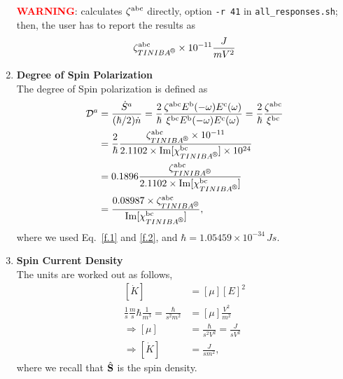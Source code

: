 \documentclass[12pt]{article}
\numberwithin{equation}{section}
\begin{document}
\begin{enumerate}
\textcolor{red}{\bf WARNING}: \tiniba calculates 
$\zeta^{\mathrm{a}\mathrm{b}\mathrm{c}}$  
directly, option 
\verb=-r 41= in 
\verb=all_responses.sh=; then, the user has to report the results as
\begin{align}\label{f.2}
\zeta^{\rma\rmb\rmc}_{\tiniba}\times 10^{-11} \frac{J}{mV^2}
\end{align}

\item{\bf Degree of Spin Polarization}\\

The degree of Spin polarization is defined as
\begin{align}\label{dsp1}
{\cal D}^a&=\frac{\dot S^a}{(\hbar/2)\dot n}
=\frac{2}{\hbar}\frac{\zeta^{\rma\rmb\rmc}E^\rmb(-\go)E^\rmc(\go)}
{\xi^{\rmb\rmc}E^\rmb(-\go)E^\rmc(\go)}
=\frac{2}{\hbar}\frac{\zeta^{\rma\rmb\rmc}}
{\xi^{\rmb\rmc}}
\nonumber\\
&=
\frac{2}{\hbar}\frac{\zeta^{\rma\rmb\rmc}_{\tiniba}\times 10^{-11}}
{2.1102\times \mathrm{Im}[\chi^{\rmb\rmc}_{\tiniba}]\times 10^{24}}
\nonumber\\
&=
0.1896\frac{\zeta^{\rma\rmb\rmc}_{\tiniba}}
{2.1102\times \mathrm{Im}[\chi^{\rmb\rmc}_{\tiniba}]}
\nonumber\\
&=
\frac{0.08987\times\zeta^{\rma\rmb\rmc}_{\tiniba}}
{\mathrm{Im}[\chi^{\rmb\rmc}_{\tiniba}]}
, 
\end{align}
where we used Eq.~\eqref{f.1} and \eqref{f.2}, and 
$\hbar=1.05459\times 10^{-34}\,Js$. 


\item {\bf Spin Current Density}\\ 

The units are worked out as follows,
\begin{align}\label{zp.1}
[\dot K]&=[\mu][E]^2 
\nonumber\\
\frac{1}{s}\frac{m}{s}\hbar\frac{1}{m^3}
=
\frac{\hbar}{s^2m^2}
&=[\mu]
\frac{V^2}{m^2} 
\nonumber\\
\Rightarrow 
[\mu]&=\frac{\hbar}{s^2V^2}=\frac{J}{sV^2}
\nonumber\\
\Rightarrow 
[\dot K]&=\frac{J}{sm^2}
,
\end{align} 
where we recall that $\hat{\mathbf{S}}$ is the spin density. 



\end{enumerate}
\end{document}
